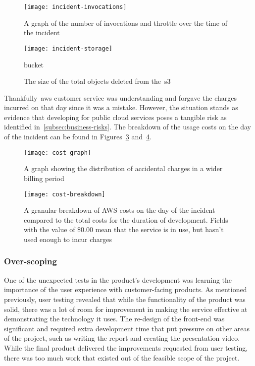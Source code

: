 \begin{figure}[!htb]
    \centering
    \texttt{[image: incident-invocations]}
    \caption{A graph of the number of invocations and throttle over the time of the incident}\label{fig:incident-invocations}
\end{figure}

\begin{figure}[!htb]
    \centering
    \texttt{[image: incident-storage]}
    \caption{The size of the total objects deleted from the~\gls{s3}} bucket\label{fig:incident-storage}
\end{figure}

Thankfully~\gls{aws} customer service was understanding and forgave the charges
incurred on that day since it was a mistake.
However,
the situation stands as evidence
that developing for public cloud services poses a tangible risk as identified in~\ref{subsec:business-risks}.
The breakdown of the usage costs on the day of the incident can be found in Figures~\ref{fig:cost-graph} and~\ref{fig:cost-breakdown}.

\begin{figure}[!htb]
    \texttt{[image: cost-graph]}
    \caption{A graph showing the distribution of accidental charges in a wider billing period}\label{fig:cost-graph}
\end{figure}

\begin{figure}[!htb]
    \centering
    \texttt{[image: cost-breakdown]}
    \caption{A granular breakdown of AWS costs on the day of the incident compared to the total costs for the duration of development. Fields with the value of \$0.00 mean that the service is in use, but hasn't used enough to incur charges}\label{fig:cost-breakdown}
\end{figure}

\subsubsection{Over-scoping}

One of the unexpected tests in the product's development was learning the importance of the user experience with customer-facing products.
As mentioned previously,
user testing revealed that while the functionality of the product was solid,
there was a lot of room for improvement in making the service effective at demonstrating the technology it uses.
The re-design of the front-end was significant
and required extra development time that put pressure on other areas of the project,
such as writing the report and creating the presentation video.
While the final product delivered the improvements requested from user testing,
there was too much work that existed out of the feasible scope of the project.

